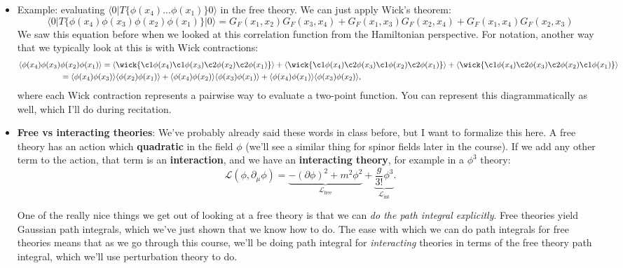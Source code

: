 \documentclass[12pt, oneside]{article}   	%
\theoremstyle{definition}
\begin{document}
\begin{itemize}
	\item Example: evaluating $\langle 0 | T\{ \phi(x_4) ... \phi(x_1) \} 0 \rangle$ in the free theory. We can just apply Wick's theorem:
	\begin{equation}
		\langle 0 | T\{\phi(x_4) \phi(x_3) \phi(x_2) \phi(x_1) \} | 0\rangle = G_F(x_1, x_2) G_F(x_3, x_4) + G_F(x_1, x_3) G_F(x_2, x_4) + G_F(x_1, x_4) G_F(x_2, x_3)
	\end{equation}
	We saw this equation before when we looked at this correlation function from the Hamiltonian perspective. For notation, another way that we typically look at this is with Wick contractions:
	\begin{align}
		\langle \phi(x_4) \phi(x_3) &\phi(x_2) \phi(x_1)\rangle = \langle \wick{ \c1 \phi(x_4) \c1 \phi(x_3) \c2 \phi(x_2) \c2 \phi(x_1) } \rangle + \langle \wick{ \c1 \phi(x_4) \c2 \phi(x_3) \c1 \phi(x_2) \c2 \phi(x_1) } \rangle + \langle \wick{ \c1 \phi(x_4) \c2 \phi(x_3) \c2 \phi(x_2) \c1 \phi(x_1) } \rangle \nonumber \\
		&= \langle \phi(x_4) \phi(x_3) \rangle \langle \phi(x_2) \phi(x_1) \rangle + \langle \phi(x_4) \phi(x_2) \rangle \langle \phi(x_3) \phi(x_1) \rangle + \langle \phi(x_4) \phi(x_1) \rangle \langle \phi(x_3) \phi(x_2) \rangle,
	\end{align}
	where each Wick contraction represents a pairwise way to evaluate a two-point function. You can represent this diagrammatically as well, which I'll do during recitation. 
	
	
	\item \textbf{Free vs interacting theories}: We've probably already said these words in class before, but I want to formalize this here. A free theory has an action which \textbf{quadratic} in the field $\phi$ (we'll see a similar thing for spinor fields later in the course). If we add any other term to the action, that term is an \textbf{interaction}, and we have an \textbf{interacting theory}, for example in a $\phi^3$ theory:
	\begin{equation}
		\mathcal L(\phi, \partial_\mu\phi) = \underbrace{-(\partial \phi)^2 + m^2\phi^2}_{\mathcal L_{\mathrm{free}}} + \underbrace{\frac{g}{3!} \phi^3 }_{\mathcal L_\mathrm{int}}.
	\end{equation}
	
	One of the really nice things we get out of looking at a free theory is that we can \textit{do the path integral explicitly}. Free theories yield Gaussian path integrals, which we've just shown that we know how to do. The ease with which we can do path integrals for free theories means that as we go through this course, we'll be doing path integral for \textit{interacting} theories in terms of the free theory path integral, which we'll use perturbation theory to do. 
	

\end{itemize}
\end{document}
